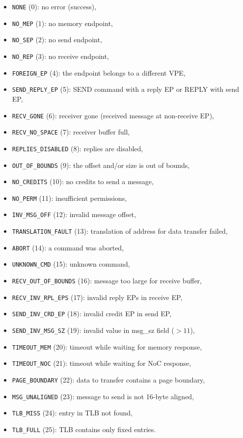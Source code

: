 \begin{itemize}
  \item \texttt{NONE} (0): no error (success),
  \item \texttt{NO\_MEP} (1): no memory endpoint,
  \item \texttt{NO\_SEP} (2): no send endpoint,
  \item \texttt{NO\_REP} (3): no receive endpoint,
  \item \texttt{FOREIGN\_EP} (4): the endpoint belongs to a different VPE,
  \item \texttt{SEND\_REPLY\_EP} (5): SEND command with a reply EP or REPLY with send EP,
  \item \texttt{RECV\_GONE} (6): receiver gone (received message at non-receive EP),
  \item \texttt{RECV\_NO\_SPACE} (7): receiver buffer full,
  \item \texttt{REPLIES\_DISABLED} (8): replies are disabled,
  \item \texttt{OUT\_OF\_BOUNDS} (9): the offset and/or size is out of bounds,
  \item \texttt{NO\_CREDITS} (10): no credits to send a message,
  \item \texttt{NO\_PERM} (11): insufficient permissions,
  \item \texttt{INV\_MSG\_OFF} (12): invalid message offset,
  \item \texttt{TRANSLATION\_FAULT} (13): translation of address for data transfer failed,
  \item \texttt{ABORT} (14): a command was aborted,
  \item \texttt{UNKNOWN\_CMD} (15): unknown command,
  \item \texttt{RECV\_OUT\_OF\_BOUNDS} (16): message too large for receive buffer,
  \item \texttt{RECV\_INV\_RPL\_EPS} (17): invalid reply EPs in receive EP,
  \item \texttt{SEND\_INV\_CRD\_EP} (18): invalid credit EP in send EP,
  \item \texttt{SEND\_INV\_MSG\_SZ} (19): invalid value in msg\_sz field ($> 11$),
  \item \texttt{TIMEOUT\_MEM} (20): timeout while waiting for memory response,
  \item \texttt{TIMEOUT\_NOC} (21): timeout while waiting for NoC response,
  \item \texttt{PAGE\_BOUNDARY} (22): data to transfer contains a page boundary,
  \item \texttt{MSG\_UNALIGNED} (23): message to send is not 16-byte aligned,
  \item \texttt{TLB\_MISS} (24): entry in TLB not found,
  \item \texttt{TLB\_FULL} (25): TLB contains only fixed entries.
\end{itemize}
